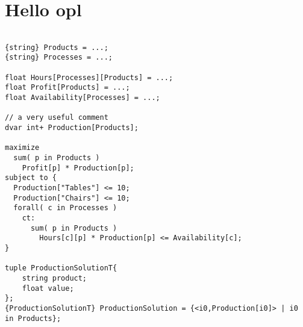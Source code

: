 \documentclass{article}
\begin{document}
	
	\section*{Hello opl}
	
	\begin{lstlisting}
	 
{string} Products = ...;
{string} Processes = ...;

float Hours[Processes][Products] = ...;
float Profit[Products] = ...;
float Availability[Processes] = ...;

// a very useful comment
dvar int+ Production[Products];
 
maximize
  sum( p in Products ) 
    Profit[p] * Production[p];
subject to {
  Production["Tables"] <= 10;
  Production["Chairs"] <= 10;
  forall( c in Processes )
    ct:
      sum( p in Products ) 
        Hours[c][p] * Production[p] <= Availability[c];
}

tuple ProductionSolutionT{ 
	string product; 
	float value; 
};
{ProductionSolutionT} ProductionSolution = {<i0,Production[i0]> | i0 in Products};

	\end{lstlisting}	
\end{document}
